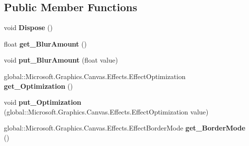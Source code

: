 \subsection*{Public Member Functions}
\begin{DoxyCompactItemize}
\item 
\mbox{\label{class_microsoft_1_1_graphics_1_1_canvas_1_1_effects_1_1_gaussian_blur_effect_a9cea4f6122394e148cdf4a3eb0624aa4}} 
void {\bfseries Dispose} ()
\item 
\mbox{\label{class_microsoft_1_1_graphics_1_1_canvas_1_1_effects_1_1_gaussian_blur_effect_a7b01eda1ee6f9bb08a3c9086d7ef1edb}} 
float {\bfseries get\+\_\+\+Blur\+Amount} ()
\item 
\mbox{\label{class_microsoft_1_1_graphics_1_1_canvas_1_1_effects_1_1_gaussian_blur_effect_a1dcdfb69af9895c2333497a0d1b4edde}} 
void {\bfseries put\+\_\+\+Blur\+Amount} (float value)
\item 
\mbox{\label{class_microsoft_1_1_graphics_1_1_canvas_1_1_effects_1_1_gaussian_blur_effect_aef6c39bc362d054ffa0e6349d24f02cd}} 
global\+::\+Microsoft.\+Graphics.\+Canvas.\+Effects.\+Effect\+Optimization {\bfseries get\+\_\+\+Optimization} ()
\item 
\mbox{\label{class_microsoft_1_1_graphics_1_1_canvas_1_1_effects_1_1_gaussian_blur_effect_af7fd358991e46db4322e11d372de3181}} 
void {\bfseries put\+\_\+\+Optimization} (global\+::\+Microsoft.\+Graphics.\+Canvas.\+Effects.\+Effect\+Optimization value)
\item 
\mbox{\label{class_microsoft_1_1_graphics_1_1_canvas_1_1_effects_1_1_gaussian_blur_effect_a1fe5f86a30992bc3bf2477a872efde7a}} 
global\+::\+Microsoft.\+Graphics.\+Canvas.\+Effects.\+Effect\+Border\+Mode {\bfseries get\+\_\+\+Border\+Mode} ()
\item 
\mbox{\label{class_microsoft_1_1_graphics_1_1_canvas_1_1_effects_1_1_gaussian_blur_effect_af4c57d16f0f76baf8d713b866be1aa8e}} 

\end{DoxyCompactItemize}
